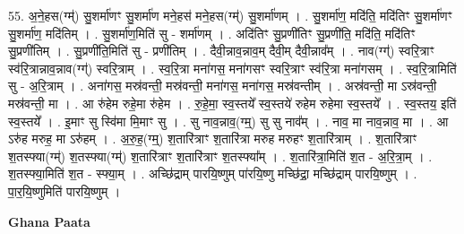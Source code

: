 \documentclass[17pt]{extarticle}
\begin{document}
55. अ॒ने॒हस(ग्म्॑) सु॒शर्मा॑णꣳ सु॒शर्मा॑ण मने॒हस॑ मने॒हस(ग्म्॑) सु॒शर्मा॑णम् । . सु॒शर्मा॑ण॒ मदि॑ति॒ मदि॑तिꣳ सु॒शर्मा॑णꣳ सु॒शर्मा॑ण॒ मदि॑तिम् । . सु॒शर्मा॑ण॒मिति॑ सु - शर्मा॑णम् । . अदि॑तिꣳ सु॒प्रणी॑तिꣳ सु॒प्रणी॑ति॒ मदि॑ति॒ मदि॑तिꣳ सु॒प्रणी॑तिम् । . सु॒प्रणी॑ति॒मिति॑ सु - प्रणी॑तिम् । . दैवी॒न्नाव॒न्नाव॒म् दैवी॒म् दैवी॒न्नाव᳚म् । . नाव(ग्ग्॑) स्वरि॒त्राꣳ स्व॑रि॒त्रान्नाव॒न्नाव(ग्ग्॑) स्वरि॒त्राम् । . स्व॒रि॒त्रा मना॑गस॒ मना॑गसꣳ स्वरि॒त्राꣳ स्व॑रि॒त्रा मना॑गसम् । . स्व॒रि॒त्रामिति॑ सु - अ॒रि॒त्राम् । . अना॑गस॒ मस्र॑वन्ती॒ मस्र॑वन्ती॒ मना॑गस॒ मना॑गस॒ मस्र॑वन्तीम् । . अस्र॑वन्ती॒ मा ऽस्र॑वन्ती॒ मस्र॑वन्ती॒ मा । . आ रु॑हेम रुहे॒मा रु॑हेम । . रु॒हे॒मा॒ स्व॒स्तये᳚ स्व॒स्तये॑ रुहेम रुहेमा स्व॒स्तये᳚ । . स्व॒स्तय॒ इति॑ स्व॒स्तये᳚ । . इ॒माꣳ सु स्वि॑मा मि॒माꣳ सु । . सु नाव॒न्नाव॒(ग्म्॒) सु सु नाव᳚म् । . नाव॒ मा नाव॒न्नाव॒ मा । . आ ऽरु॑ह मरुह॒ मा ऽरु॑हम् । . अ॒रु॒ह॒(ग्म्॒) श॒तारि॑त्राꣳ श॒तारि॑त्रा मरुह मरुहꣳ श॒तारि॑त्राम् । . श॒तारि॑त्राꣳ श॒तस्फ्या(ग्म्॑) श॒तस्फ्या(ग्म्॑) श॒तारि॑त्राꣳ श॒तारि॑त्राꣳ श॒तस्फ्या᳚म् । . श॒तारि॑त्रा॒मिति॑ श॒त - अ॒रि॒त्रा॒म् । . श॒तस्फ्या॒मिति॑ श॒त - स्फ्या॒म् । . अच्छि॑द्राम् पारयि॒ष्णुम् पा॑रयि॒ष्णु मच्छि॑द्रा॒ मच्छि॑द्राम् पारयि॒ष्णुम् । . पा॒र॒यि॒ष्णुमिति॑ पारयि॒ष्णुम् । \newline

\textbf{Ghana Paata } \newline
\end{document}
